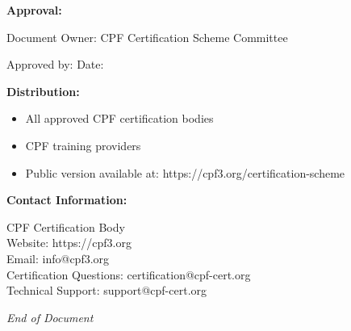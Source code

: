 \documentclass[11pt,a4paper]{article}
\begin{document}
\textbf{Approval:}

Document Owner: CPF Certification Scheme Committee

Approved by: \underline{\hspace{8cm}} Date: \underline{\hspace{4cm}}

\textbf{Distribution:}
\begin{itemize}
\item All approved CPF certification bodies
\item CPF training providers
\item Public version available at: https://cpf3.org/certification-scheme
\end{itemize}

\textbf{Contact Information:}

CPF Certification Body\\
Website: https://cpf3.org\\
Email: info@cpf3.org\\
Certification Questions: certification@cpf-cert.org\\
Technical Support: support@cpf-cert.org

\vspace{2em}

\begin{center}
\textit{End of Document}
\end{center}
\end{document}
